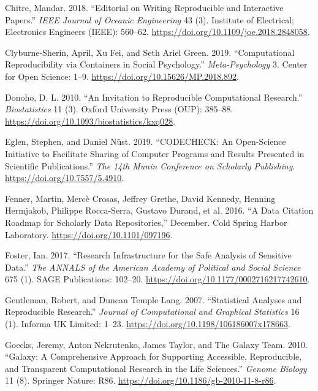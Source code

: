 \documentclass[onecolumn]{article}
\begin{document}
\leavevmode\hypertarget{ref-chitre2018editorial}{}%
Chitre, Mandar. 2018. ``Editorial on Writing Reproducible and
Interactive Papers.'' \emph{IEEE Journal of Oceanic Engineering} 43 (3).
Institute of Electrical; Electronics Engineers (IEEE): 560--62.
\url{https://doi.org/10.1109/joe.2018.2848058}.

\leavevmode\hypertarget{ref-clyburne2019computational}{}%
Clyburne-Sherin, April, Xu Fei, and Seth Ariel Green. 2019.
``Computational Reproducibility via Containers in Social Psychology.''
\emph{Meta-Psychology} 3. Center for Open Science: 1--9.
\url{https://doi.org/10.15626/MP.2018.892}.

\leavevmode\hypertarget{ref-donoho2010invitation}{}%
Donoho, D. L. 2010. ``An Invitation to Reproducible Computational
Research.'' \emph{Biostatistics} 11 (3). Oxford University Press (OUP):
385--88. \url{https://doi.org/10.1093/biostatistics/kxq028}.

\leavevmode\hypertarget{ref-eglen2019}{}%
Eglen, Stephen, and Daniel Nüst. 2019. ``CODECHECK: An Open-Science
Initiative to Facilitate Sharing of Computer Programs and Results
Presented in Scientific Publications.'' \emph{The 14th Munin Conference
on Scholarly Publishing}. \url{https://doi.org/10.7557/5.4910}.

\leavevmode\hypertarget{ref-Fenner_2016}{}%
Fenner, Martin, Mercè Crosas, Jeffrey Grethe, David Kennedy, Henning
Hermjakob, Philippe Rocca-Serra, Gustavo Durand, et al. 2016. ``A Data
Citation Roadmap for Scholarly Data Repositories,'' December. Cold
Spring Harbor Laboratory. \url{https://doi.org/10.1101/097196}.

\leavevmode\hypertarget{ref-foster2018research}{}%
Foster, Ian. 2017. ``Research Infrastructure for the Safe Analysis of
Sensitive Data.'' \emph{The ANNALS of the American Academy of Political
and Social Science} 675 (1). SAGE Publications: 102--20.
\url{https://doi.org/10.1177/0002716217742610}.

\leavevmode\hypertarget{ref-gentleman2007statistical}{}%
Gentleman, Robert, and Duncan Temple Lang. 2007. ``Statistical Analyses
and Reproducible Research.'' \emph{Journal of Computational and
Graphical Statistics} 16 (1). Informa UK Limited: 1--23.
\url{https://doi.org/10.1198/106186007x178663}.

\leavevmode\hypertarget{ref-goecks2010galaxy}{}%
Goecks, Jeremy, Anton Nekrutenko, James Taylor, and The Galaxy Team.
2010. ``Galaxy: A Comprehensive Approach for Supporting Accessible,
Reproducible, and Transparent Computational Research in the Life
Sciences.'' \emph{Genome Biology} 11 (8). Springer Nature: R86.
\url{https://doi.org/10.1186/gb-2010-11-8-r86}.
\end{document}
